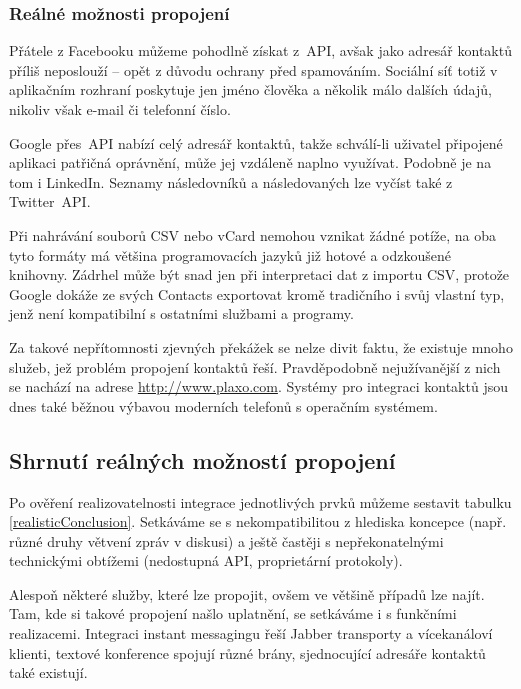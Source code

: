 \documentclass[12pt,oneside,final]{fithesis2}
\begin{document}
\subsubsection*{Reálné možnosti propojení}
Přátele z Facebooku můžeme pohodlně získat z~API, avšak jako adresář kontaktů příliš neposlouží -- opět z důvodu ochrany před spamováním. Sociální síť totiž v aplikačním rozhraní poskytuje jen jméno člověka a několik málo dalších údajů, nikoliv však e-mail či telefonní číslo.

Google přes~API nabízí celý adresář kontaktů, takže schválí-li uživatel připojené aplikaci patřičná oprávnění, může jej vzdáleně naplno využívat. Podobně je na tom i LinkedIn. Seznamy následovníků a následovaných lze vyčíst také z Twitter~API.

Při nahrávání souborů CSV nebo vCard nemohou vznikat žádné potíže, na oba tyto formáty má většina programovacích jazyků již hotové a odzkoušené knihovny. Zádrhel může být snad jen při interpretaci dat z importu CSV, protože Google dokáže ze svých Contacts exportovat kromě tradičního i svůj vlastní typ, jenž není kompatibilní s ostatními službami a programy.

Za takové nepřítomnosti zjevných překážek se nelze divit faktu, že existuje mnoho služeb, jež problém propojení kontaktů řeší. Pravděpodobně nejužívanější z nich se nachází na adrese \url{http://www.plaxo.com}. Systémy pro integraci kontaktů jsou dnes také běžnou výbavou moderních telefonů s operačním systémem.

\subsection{Shrnutí reálných možností propojení}
Po ověření realizovatelnosti integrace jednotlivých prvků můžeme sestavit tabulku \ref{realisticConclusion}. Setkáváme se s nekompatibilitou z hlediska koncepce (např. různé druhy větvení zpráv v diskusi) a ještě častěji s nepřekonatelnými technickými obtížemi (nedostupná API, proprietární protokoly).

Alespoň některé služby, které lze propojit, ovšem ve většině případů lze najít. Tam, kde si takové propojení našlo uplatnění, se setkáváme i s funkčními realizacemi. Integraci instant messagingu řeší Jabber transporty a vícekanáloví klienti, textové konference spojují různé brány, sjednocující adresáře kontaktů také existují.
\end{document}
